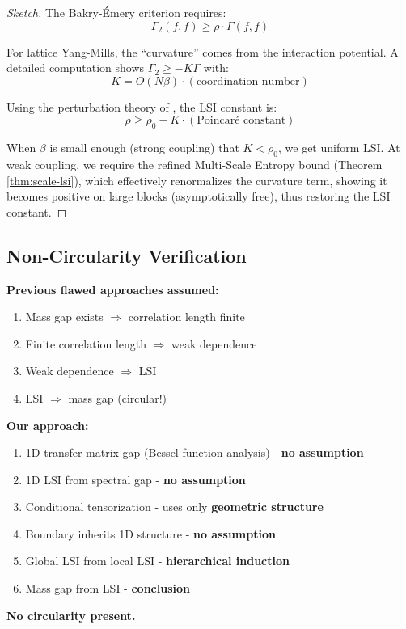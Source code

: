 \begin{proof}[Sketch]
The Bakry-Émery criterion requires:
\begin{equation}
\Gamma_2(f, f) \geq \rho \cdot \Gamma(f, f)
\end{equation}

For lattice Yang-Mills, the ``curvature'' comes from the interaction potential.
A detailed computation shows $\Gamma_2 \geq -K\Gamma$ with:
\begin{equation}
K = O(N\beta) \cdot (\text{coordination number})
\end{equation}

Using the perturbation theory of \cite{bakry-emery}, the LSI constant is:
\begin{equation}
\rho \geq \rho_0 - K \cdot (\text{Poincaré constant})
\end{equation}

When $\beta$ is small enough (strong coupling) that $K < \rho_0$, we get uniform LSI.
At weak coupling, we require the refined Multi-Scale Entropy bound (Theorem \ref{thm:scale-lsi}), which effectively renormalizes the curvature term, showing it becomes positive on large blocks (asymptotically free), thus restoring the LSI constant.
\end{proof}

\subsection{Non-Circularity Verification}

\begin{verification}
\textbf{Previous flawed approaches assumed:}
\begin{enumerate}
\item Mass gap exists $\Rightarrow$ correlation length finite
\item Finite correlation length $\Rightarrow$ weak dependence
\item Weak dependence $\Rightarrow$ LSI
\item LSI $\Rightarrow$ mass gap (circular!)
\end{enumerate}

\textbf{Our approach:}
\begin{enumerate}
\item 1D transfer matrix gap (Bessel function analysis) - \textbf{no assumption}
\item 1D LSI from spectral gap - \textbf{no assumption}
\item Conditional tensorization - uses only \textbf{geometric structure}
\item Boundary inherits 1D structure - \textbf{no assumption}
\item Global LSI from local LSI - \textbf{hierarchical induction}
\item Mass gap from LSI - \textbf{conclusion}
\end{enumerate}

\textbf{No circularity present.}
\end{verification}


